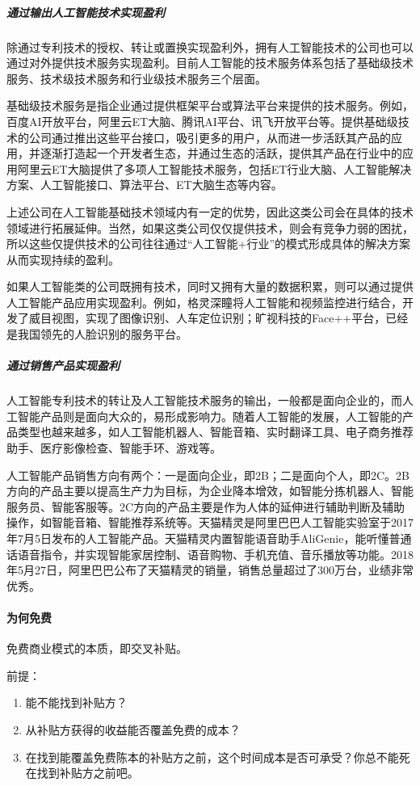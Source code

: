 \documentclass[letterpaper,10pt,english]{sphinxmanual}
\begin{document}
\subparagraph{通过输出人工智能技术实现盈利}
\label{\detokenize{chapter_introduction/money:id23}}
除通过专利技术的授权、转让或置换实现盈利外，拥有人工智能技术的公司也可以通过对外提供技术服务实现盈利。目前人工智能的技术服务体系包括了基础级技术服务、技术级技术服务和行业级技术服务三个层面。

基础级技术服务是指企业通过提供框架平台或算法平台来提供的技术服务。例如，百度AI开放平台，阿里云ET大脑、腾讯AI平台、讯飞开放平台等。提供基础级技术的公司通过推出这些平台接口，吸引更多的用户，从而进一步活跃其产品的应用，并逐渐打造起一个开发者生态，并通过生态的活跃，提供其产品在行业中的应用阿里云ET大脑提供了多项人工智能技术服务，包括ET行业大脑、人工智能解决方案、人工智能接口、算法平台、ET大脑生态等内容。

上述公司在人工智能基础技术领域内有一定的优势，因此这类公司会在具体的技术领域进行拓展延伸。当然，如果这类公司仅仅提供技术，则会有竞争力弱的困扰，所以这些仅提供技术的公司往往通过“人工智能+行业”的模式形成具体的解决方案从而实现持续的盈利。

如果人工智能类的公司既拥有技术，同时又拥有大量的数据积累，则可以通过提供人工智能产品应用实现盈利。例如，格灵深瞳将人工智能和视频监控进行结合，开发了威目视图，实现了图像识别、人车定位识别；旷视科技的Face++平台，已经是我国领先的人脸识别的服务平台。


\subparagraph{通过销售产品实现盈利}
\label{\detokenize{chapter_introduction/money:id24}}
人工智能专利技术的转让及人工智能技术服务的输出，一般都是面向企业的，而人工智能产品则是面向大众的，易形成影响力。随着人工智能的发展，人工智能的产品类型也越来越多，如人工智能机器人、智能音箱、实时翻译工具、电子商务推荐助手、医疗影像检查、智能手环、游戏等。

人工智能产品销售方向有两个：一是面向企业，即2B；二是面向个人，即2C。2B方向的产品主要以提高生产力为目标，为企业降本增效，如智能分拣机器人、智能服务员、智能客服等。2C方向的产品主要是作为人体的延伸进行辅助判断及辅助操作，如智能音箱、智能推荐系统等。天猫精灵是阿里巴巴人工智能实验室于2017年7月5日发布的人工智能产品。天猫精灵内置智能语音助手AliGenie，能听懂普通话语音指令，并实现智能家居控制、语音购物、手机充值、音乐播放等功能。2018年5月27日，阿里巴巴公布了天猫精灵的销量，销售总量超过了300万台，业绩非常优秀。


\paragraph{为何免费}
\label{\detokenize{chapter_introduction/money:id25}}
免费商业模式的本质，即交叉补贴。

前提：
\begin{enumerate}
%
\item {} 
能不能找到补贴方？

\item {} 
从补贴方获得的收益能否覆盖免费的成本？

\item {} 
在找到能覆盖免费陈本的补贴方之前，这个时间成本是否可承受？你总不能死在找到补贴方之前吧。

\end{enumerate}
\end{document}
